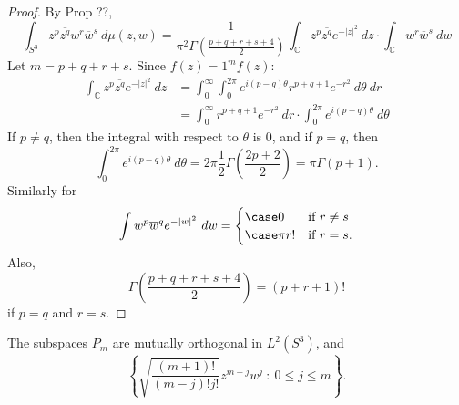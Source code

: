 \documentclass{article}
\begin{document}
\begin{proof}
    By Prop ??, 
    \begin{equation}
        \int_{S^{3}} z^{p} \overline{z^{q}} w^{r} \overline{w}^{s} \ d\mu(z,w)
        =
        \frac{1}{\pi^{2} \Gamma(\frac{p+q+r+s+4}{2})} \int_{\mathbb{C}} z^{p} \overline{z^{q}} e^{-| z |^{2}} \ dz \cdot \int_{\mathbb{C}} w^{r} \overline{w}^{s}  \ dw
    \end{equation}
    Let $m=p+q+r+s$. Since $f(z) = 1^{m}f(z)$:
    \begin{equation}
        \begin{split}
            \int_{\mathbb{C}} z^{p} \overline{z^{q}} e^{-| z |^{2}} \ dz 
            &=
            \int^{\infty}_{0} \int^{2\pi}_{0} e^{i(p-q)\theta} r^{p+q+1} e^{-r^{2}} \ d\theta \ dr \\
            &= 
            \int^{\infty}_{0} r^{p+q+1} e^{-r^{2}}  \ dr \cdot \int^{2\pi}_{0} e^{i(p-q)\theta} \ d\theta
        \end{split}
    \end{equation}
    If $p\neq q$, then the integral with respect to $\theta$ is 0, and if $p=q$, then
    \begin{equation}
        \int^{2\pi}_{0} e^{i(p-q)\theta} \ d\theta 
        =
        2\pi \frac{1}{2} \Gamma (\frac{2p+2}{2}) 
        = \pi \Gamma ({p+1}) .
    \end{equation}
    Similarly for 
    \begin{equation}
        \int w^{p} \overline{w}^{q} e^{-| w |^{2}} \ dw
        =
        \begin{cases}
            \case 0 &\text{if } r\neq s \\
            \case \pi r! & \text{if } r=s. \\
        \end{cases}
    \end{equation}
    Also, 
    \begin{equation}
        \Gamma \left(\frac{p+q+r+s+4}{2}\right) = (p+r+1)! 
    \end{equation}
    if $p=q$ and $r=s$.
\end{proof}

\begin{theorem}
    The subspaces $P_m$ are mutually orthogonal in $L^{2}(S^{3})$, and 
    \begin{equation}
        \left\{ \sqrt{\frac{(m+1)!}{(m-j)! j!}} z^{m-j}w^{j} \ : \ 0 \leq j \leq m \right\}.
    \end{equation}
\end{theorem}
\end{document}
